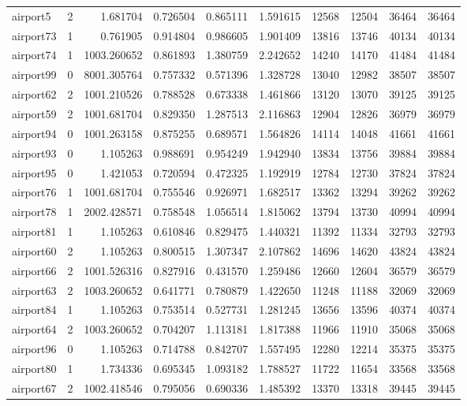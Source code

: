 \begin{longtable}{|l|r|r|r|r|r|r|r|r|r|}
airport5 & 2 & 1.681704 & 0.726504 & 0.865111 & 1.591615 & 12568 & 12504 & 36464 & 36464 \\
airport73 & 1 & 0.761905 & 0.914804 & 0.986605 & 1.901409 & 13816 & 13746 & 40134 & 40134 \\
airport74 & 1 & 1003.260652 & 0.861893 & 1.380759 & 2.242652 & 14240 & 14170 & 41484 & 41484 \\
airport99 & 0 & 8001.305764 & 0.757332 & 0.571396 & 1.328728 & 13040 & 12982 & 38507 & 38507 \\
airport62 & 2 & 1001.210526 & 0.788528 & 0.673338 & 1.461866 & 13120 & 13070 & 39125 & 39125 \\
airport59 & 2 & 1001.681704 & 0.829350 & 1.287513 & 2.116863 & 12904 & 12826 & 36979 & 36979 \\
airport94 & 0 & 1001.263158 & 0.875255 & 0.689571 & 1.564826 & 14114 & 14048 & 41661 & 41661 \\
airport93 & 0 & 1.105263 & 0.988691 & 0.954249 & 1.942940 & 13834 & 13756 & 39884 & 39884 \\
airport95 & 0 & 1.421053 & 0.720594 & 0.472325 & 1.192919 & 12784 & 12730 & 37824 & 37824 \\
airport76 & 1 & 1001.681704 & 0.755546 & 0.926971 & 1.682517 & 13362 & 13294 & 39262 & 39262 \\
airport78 & 1 & 2002.428571 & 0.758548 & 1.056514 & 1.815062 & 13794 & 13730 & 40994 & 40994 \\
airport81 & 1 & 1.105263 & 0.610846 & 0.829475 & 1.440321 & 11392 & 11334 & 32793 & 32793 \\
airport60 & 2 & 1.105263 & 0.800515 & 1.307347 & 2.107862 & 14696 & 14620 & 43824 & 43824 \\
airport66 & 2 & 1001.526316 & 0.827916 & 0.431570 & 1.259486 & 12660 & 12604 & 36579 & 36579 \\
airport63 & 2 & 1003.260652 & 0.641771 & 0.780879 & 1.422650 & 11248 & 11188 & 32069 & 32069 \\
airport84 & 1 & 1.105263 & 0.753514 & 0.527731 & 1.281245 & 13656 & 13596 & 40374 & 40374 \\
airport64 & 2 & 1003.260652 & 0.704207 & 1.113181 & 1.817388 & 11966 & 11910 & 35068 & 35068 \\
airport96 & 0 & 1.105263 & 0.714788 & 0.842707 & 1.557495 & 12280 & 12214 & 35375 & 35375 \\
airport80 & 1 & 1.734336 & 0.695345 & 1.093182 & 1.788527 & 11722 & 11654 & 33568 & 33568 \\
airport67 & 2 & 1002.418546 & 0.795056 & 0.690336 & 1.485392 & 13370 & 13318 & 39445 & 39445 \\

\end{longtable}
